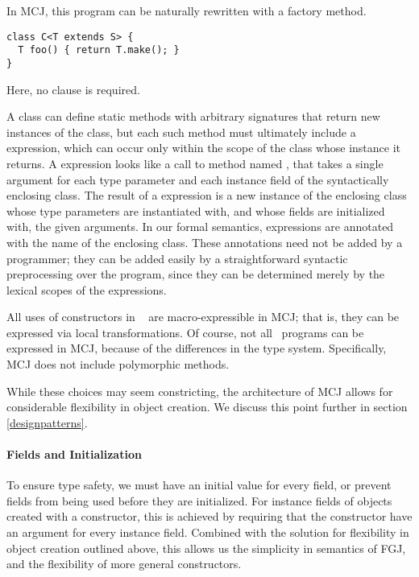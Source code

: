 \documentclass[nocopyrightspace,10pt]{acm-sigplan}
\begin{document}
In MCJ, this program can be naturally rewritten with a factory method.

\begin{verbatim}
class C<T extends S> {
  T foo() { return T.make(); }
}
\end{verbatim}

Here, no  clause is required.  

A class can define static methods with arbitrary signatures that return
new instances of the class, but each such method must ultimately
include a {} expression, which can occur only within the
scope of the class whose instance it returns. A {} expression
looks like a call to method named {}, that takes a single
argument for each type parameter and each instance field of the
syntactically enclosing class. The result of a {} expression
is a new instance of the enclosing class whose type parameters are
instantiated with, and whose fields are initialized with, the given
arguments. In our formal semantics, {} expressions are
annotated with the name of the enclosing class. These annotations need
not be added by a programmer; they can be added easily by a
straightforward syntactic preprocessing over the program, since they
can be determined merely by the lexical scopes of the {}
expressions.

All uses of constructors in \FGJ\ \cite{FJ} are macro-expressible
\cite{FellExpress} in MCJ; that is, they can be expressed via local
transformations.  Of course, not all \FGJ\ programs can be expressed
in MCJ, because of the differences in the type system. Specifically,
MCJ does not include polymorphic methods.

While these choices may seem constricting, the architecture of MCJ
allows for considerable flexibility in object creation.  We discuss
this point further in section \ref{designpatterns}.

\paragraph{Fields and Initialization}

To ensure type safety, we must have an initial value for every field,
or prevent fields from being used before they are initialized.  For
instance fields of objects created with a constructor, this is achieved
by requiring that the constructor have an argument for every instance
field.  Combined with the solution for flexibility in object creation
outlined above, this allows us the simplicity in semantics of FGJ, and
the flexibility of more general constructors.  
\end{document}
